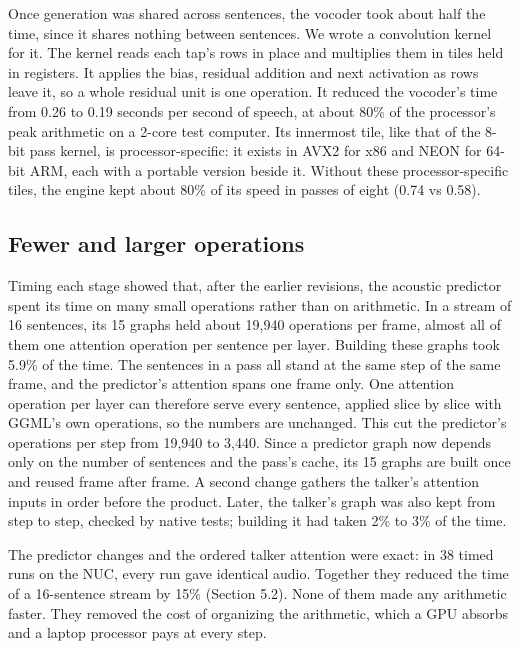 \documentclass[11pt]{article}
\begin{document}
Once generation was shared across sentences, the vocoder took about half
the time, since it shares nothing between sentences. We wrote a
convolution kernel for it. The kernel reads each tap's rows in place and
multiplies them in tiles held in registers. It applies the bias,
residual addition and next activation as rows leave it, so a whole
residual unit is one operation. It reduced the vocoder's time from 0.26
to 0.19 seconds per second of speech, at about 80\% of the processor's
peak arithmetic on a 2-core test computer. Its innermost tile, like that
of the 8-bit pass kernel, is processor-specific: it exists in AVX2 for
x86 and NEON for 64-bit ARM, each with a portable version beside it.
Without these processor-specific tiles, the engine kept about 80\% of
its speed in passes of eight (0.74 vs 0.58).

\hypertarget{fewer-and-larger-operations}{%
\subsection{Fewer and larger
operations}\label{fewer-and-larger-operations}}

Timing each stage showed that, after the earlier revisions, the acoustic
predictor spent its time on many small operations rather than on
arithmetic. In a stream of 16 sentences, its 15 graphs held about 19,940
operations per frame, almost all of them one attention operation per
sentence per layer. Building these graphs took 5.9\% of the time. The
sentences in a pass all stand at the same step of the same frame, and
the predictor's attention spans one frame only. One attention operation
per layer can therefore serve every sentence, applied slice by slice
with GGML's own operations, so the numbers are unchanged. This cut the
predictor's operations per step from 19,940 to 3,440. Since a predictor
graph now depends only on the number of sentences and the pass's cache,
its 15 graphs are built once and reused frame after frame. A second
change gathers the talker's attention inputs in order before the
product. Later, the talker's graph was also kept from step to step,
checked by native tests; building it had taken 2\% to 3\% of the time.

The predictor changes and the ordered talker attention were exact: in 38
timed runs on the NUC, every run gave identical audio. Together they
reduced the time of a 16-sentence stream by 15\% (Section 5.2). None of
them made any arithmetic faster. They removed the cost of organizing the
arithmetic, which a GPU absorbs and a laptop processor pays at every
step.
\end{document}
